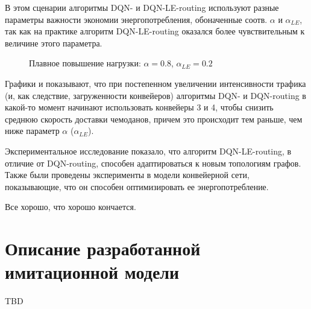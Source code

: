 \documentclass[specification,annotation,times]{itmo-student-thesis}
\theoremstyle{definition}
\begin{document}
В этом сценарии алгоритмы DQN- и DQN-LE-routing используют разные параметры
важности экономии энергопотребления, обоначенные соотв. $\alpha$ и
$\alpha_{LE}$, так как на практике алгоритм DQN-LE-routing оказался более
чувствительным к величине этого параметра.

\begin{figure}[!h]
  \centering
  \hfil
  \caption{Плавное повышение нагрузки: $\alpha = 0.8$, $\alpha_{LE} = 0.2$}\label{experiments:conveyors:2-early}
\end{figure}

Графики \label{experiments:conveyors:2-late}
и \label{experiments:conveyors:2-early} показывают, что при постепенном
увеличении интенсивности трафика (и, как следствие, загруженности конвейеров)
алгоритмы DQN- и DQN-routing в какой-то момент начинают использовать конвейеры 3
и 4, чтобы снизить среднюю скорость доставки чемоданов, причем это происходит
тем раньше, чем ниже параметр $\alpha$ ($\alpha_{LE}$).

\chapterconclusion

Экспериментальное исследование показало, что алгоритм DQN-LE-routing, в отличие
от DQN-routing, способен адаптироваться к новым топологиям графов. Также были
проведены эксперименты в модели конвейерной сети, показывающие, что он способен
оптимизировать ее энергопотребление.

\startconclusionpage

Все хорошо, что хорошо кончается.

\printmainbibliography

\appendix



\chapter{Описание разработанной имитационной модели}\label{apx:simulators}

TBD

\end{document}
